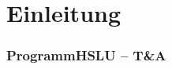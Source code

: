 \section{Einleitung}

\author{Ervin Mazlagi\'c}

\begin{frame}\frametitle{Programm\hfill{}\footnotesize HSLU -- T\&A}
\tableofcontents[hideallsubsections]
\end{frame}
